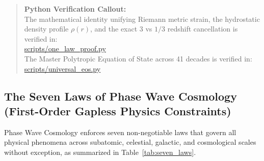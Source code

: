 \documentclass[11pt,a4paper]{article}
\begin{document}
\begin{quote}
\textbf{Python Verification Callout:}\\
The mathematical identity unifying Riemann metric strain, the hydrostatic density profile $\rho(r)$, and the exact $3$ vs $1/3$ redshift cancellation is verified in:\\
\url{scripts/one_law_proof.py}\\
The Master Polytropic Equation of State across 41 decades is verified in:\\
\url{scripts/universal_eos.py}
\end{quote}


\subsection{The Seven Laws of Phase Wave Cosmology (First-Order Gapless Physics Constraints)}
\label{subsec:seven_laws}

Phase Wave Cosmology enforces seven non-negotiable laws that govern all physical phenomena across subatomic, celestial, galactic, and cosmological scales without exception, as summarized in Table~\ref{tab:seven_laws}.
\end{document}
